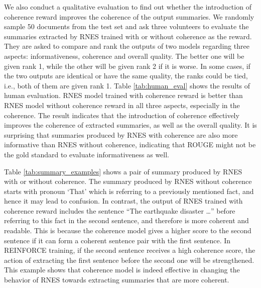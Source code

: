 \documentclass[letterpaper]{article} \usepackage{aaai18}  \usepackage{times}  \usepackage{helvet}  \usepackage{courier}  \usepackage{url}  \usepackage{graphicx}  \usepackage{amssymb}
\begin{document}
	We also conduct a qualitative evaluation to find out whether the introduction of coherence reward improves the coherence of the output summaries. We randomly sample 50 documents from the test set and ask three volunteers to evaluate the summaries extracted by RNES trained with or without coherence as the reward. They are asked to compare and rank the outputs of two models regarding three aspects: informativeness, coherence and overall quality. The better one will be given rank 1, while the other will be given rank 2 if it is worse. In some cases, if the two outputs are identical or have the same quality, the ranks could be tied, i.e., both of them are given rank 1. Table \ref{tab:human_eval} shows the results of human evaluation. RNES model trained with coherence reward is better than RNES model without coherence reward in all three aspects, especially in the coherence. The result indicates that the introduction of coherence effectively improves the coherence of extracted summaries, as well as the overall quality. It is surprising that summaries produced by RNES with coherence are also more informative than RNES without coherence, indicating that ROUGE might not be the gold standard to evaluate informativeness as well. 
	
	Table \ref{tab:summary_examples} shows a pair of summary produced by RNES with or without coherence. The summary produced by RNES without coherence starts with pronoun `That' which is referring to a previously mentioned fact, and hence it may lead to confusion. In contrast, the output of RNES trained with coherence reward includes the sentence ``The earthquake disaster \dots'' before referring to this fact in the second sentence, and therefore is more coherent and readable. This is because the coherence model gives a higher score to the second sentence if it can form a coherent sentence pair with the first sentence. In REINFORCE training, if the second sentence receives a high coherence score, the action of extracting the first sentence before the second one will be strengthened. This example shows that coherence model is indeed effective in changing the behavior of RNES towards extracting summaries that are more coherent.
		
\end{document}
